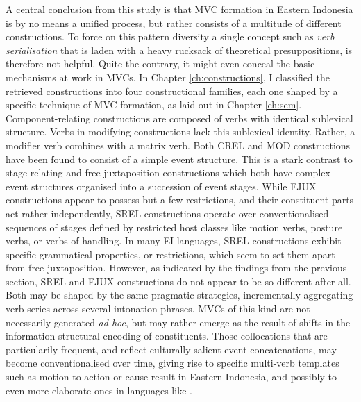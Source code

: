 A central conclusion from this study is that MVC formation in Eastern Indonesia is by no means a unified process, but rather consists of a multitude of different constructions. To force on this pattern diversity a single concept such as \textit{verb serialisation} that is laden with a heavy rucksack of theoretical presuppositions, is therefore not helpful. Quite the contrary, it might even conceal the basic mechanisms at work in MVCs. In Chapter \ref{ch:constructions}, I classified the retrieved constructions into four constructional families, each one shaped by a specific technique of MVC formation, as laid out in Chapter \ref{ch:sem}. Component-relating constructions are composed of verbs with identical sublexical structure. Verbs in modifying constructions lack this sublexical identity. Rather, a modifier verb combines with a matrix verb. Both CREL and MOD constructions have been found to consist of a simple event structure. This is a stark contrast to stage-relating and free juxtaposition constructions which both have complex event structures organised into a succession of event stages. While FJUX constructions appear to possess but a few restrictions, and their constituent parts act rather independently, SREL constructions operate over conventionalised sequences of stages defined by restricted host classes like motion verbs, posture verbs, or verbs of handling. In many EI languages, SREL constructions exhibit specific grammatical properties, or restrictions, which seem to set them apart from free juxtaposition. However, as indicated by the findings from the previous section, SREL and FJUX constructions do not appear to be so different after all. Both may be shaped by the same pragmatic strategies, incrementally aggregating verb series across several intonation phrases. MVCs of this kind are not necessarily generated \textit{ad hoc}, but may rather emerge as the result of shifts in the information-structural encoding of constituents. Those collocations that are particularily frequent, and reflect culturally salient event concatenations, may become conventionalised over time, giving rise to specific multi-verb templates such as motion-to-action or cause-result in Eastern Indonesia, and possibly to even more elaborate ones in languages like .

